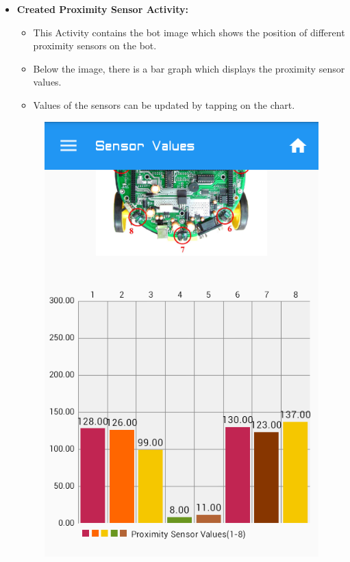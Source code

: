 \documentclass[a4paper,12pt,oneside]{book}
\begin{document}
\begin{enumerate}
\begin{itemize}
			\newpage
			\item \textbf{Created Proximity Sensor Activity:}
			\begin{itemize}
				\item This Activity contains the bot image which shows the position of different proximity sensors on the bot.
				\item Below the image, there is a bar graph which displays the proximity sensor values.
				\item Values of the sensors can be updated by tapping on the chart.
			\end{itemize}
			\begin{figure}[h]
					\begin{center}
						\includegraphics[scale=0.4]{proximitysensor.png}
					\end{center}

\end{figure}
\end{itemize}
\end{enumerate}
\end{document}
